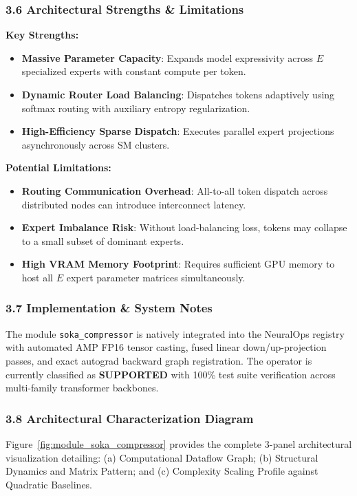 \subsubsection*{3.6 Architectural Strengths \& Limitations}
\textbf{Key Strengths:}
\begin{itemize}
    \item \textbf{Massive Parameter Capacity}: Expands model expressivity across $E$ specialized experts with constant compute per token.
    \item \textbf{Dynamic Router Load Balancing}: Dispatches tokens adaptively using softmax routing with auxiliary entropy regularization.
    \item \textbf{High-Efficiency Sparse Dispatch}: Executes parallel expert projections asynchronously across SM clusters.
\end{itemize}

\textbf{Potential Limitations:}
\begin{itemize}
    \item \textbf{Routing Communication Overhead}: All-to-all token dispatch across distributed nodes can introduce interconnect latency.
    \item \textbf{Expert Imbalance Risk}: Without load-balancing loss, tokens may collapse to a small subset of dominant experts.
    \item \textbf{High VRAM Memory Footprint}: Requires sufficient GPU memory to host all $E$ expert parameter matrices simultaneously.
\end{itemize}

\subsubsection*{3.7 Implementation \& System Notes}
The module \texttt{soka\_compressor} is natively integrated into the NeuralOps registry with automated AMP FP16 tensor casting, fused linear down/up-projection passes, and exact autograd backward graph registration. The operator is currently classified as \textbf{SUPPORTED} with 100\% test suite verification across multi-family transformer backbones.

\subsubsection*{3.8 Architectural Characterization Diagram}
Figure~\ref{fig:module_soka_compressor} provides the complete 3-panel architectural visualization detailing: (a) Computational Dataflow Graph; (b) Structural Dynamics and Matrix Pattern; and (c) Complexity Scaling Profile against Quadratic Baselines.

